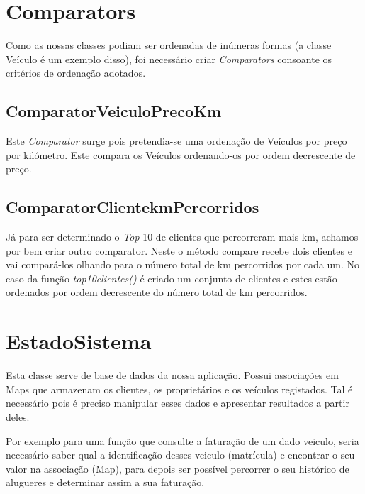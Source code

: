 \documentclass[a4paper,11pt]{report}
\begin{document}
\section{Comparators}

\hspace{0.50cm} Como as nossas classes podiam ser ordenadas de inúmeras formas (a classe Veículo é um exemplo disso), foi necessário criar \textit{Comparators} consoante os critérios de ordenação adotados.

\subsection{ComparatorVeiculoPrecoKm}

\hspace{0.50cm} Este \textit{Comparator} surge pois pretendia-se uma ordenação de Veículos por preço por kilómetro. Este compara os Veículos ordenando-os por ordem decrescente de preço.

\subsection{ComparatorClientekmPercorridos}

\hspace{0.50cm} Já para ser determinado o \textit{Top} 10 de clientes que percorreram mais km, achamos por bem criar outro comparator. Neste o método compare recebe dois clientes e vai compará-los olhando para o número total de km percorridos por cada um. No caso da função \textit{top10clientes()} é criado um conjunto de clientes e estes estão ordenados por ordem decrescente do número total de km percorridos. 

\section{EstadoSistema}

\hspace{0.50cm} Esta classe serve de base de dados da nossa aplicação. Possui associações em Maps que armazenam os clientes, os proprietários e os veículos registados. Tal é necessário pois é preciso manipular esses dados e apresentar resultados a partir deles.

\vspace{0.5cm}

Por exemplo para uma função que consulte a faturação de um dado veiculo, seria necessário saber qual a identificação desses veiculo (matrícula) e encontrar o seu valor na associação (Map), para depois ser possível percorrer o seu histórico de alugueres e determinar assim a sua faturação. 
\end{document}
